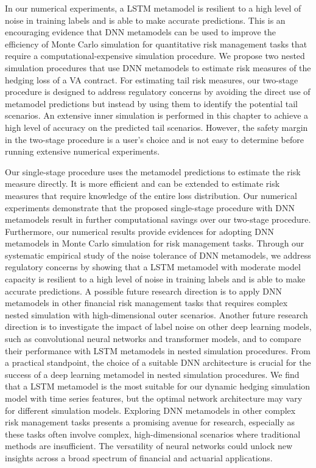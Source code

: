 In our numerical experiments, a LSTM metamodel is resilient to a high level of noise in training labels and is able to make accurate predictions. 
This is an encouraging evidence that DNN metamodels can be used to improve the efficiency of Monte Carlo simulation for quantitative risk management tasks that require a computational-expensive simulation procedure.
We propose two nested simulation procedures that use DNN metamodels to estimate risk measures of the hedging loss of a VA contract.
For estimating tail risk measures, our two-stage procedure is designed to address regulatory concerns by avoiding the direct use of metamodel predictions but instead by using them to identify the potential tail scenarios.
An extensive inner simulation is performed in this chapter to achieve a high level of accuracy on the predicted tail scenarios.
However, the safety margin in the two-stage procedure is a user's choice and is not easy to determine before running extensive numerical experiments.

Our single-stage procedure uses the metamodel predictions to estimate the risk measure directly.
It is more efficient and can be extended to estimate risk measures that require knowledge of the entire loss distribution.
Our numerical experiments demonstrate that the proposed single-stage procedure with DNN metamodels result in further computational savings over our two-stage procedure. 
Furthermore, our numerical results provide evidences for adopting DNN metamodels in Monte Carlo simulation for risk management tasks.
Through our systematic empirical study of the noise tolerance of DNN metamodels, we address regulatory concerns by showing that a LSTM metamodel with moderate model capacity is resilient to a high level of noise in training labels and is able to make accurate predictions.
A possible future research direction is to apply DNN metamodels in other financial risk management tasks that requires complex nested simulation with high-dimensional outer scenarios.
Another future research direction is to investigate the impact of label noise on other deep learning models, such as convolutional neural networks and transformer models, and to compare their performance with LSTM metamodels in nested simulation procedures. 
From a practical standpoint, the choice of a suitable DNN architecture is crucial for the success of a deep learning metamodel in nested simulation procedures.
We find that a LSTM metamodel is the most suitable for our dynamic hedging simulation model with time series features, but the optimal network architecture may vary for different simulation models.
Exploring DNN metamodels in other complex risk management tasks presents a promising avenue for research, especially as these tasks often involve complex, high-dimensional scenarios where traditional methods are insufficient. 
The versatility of neural networks could unlock new insights across a broad spectrum of financial and actuarial applications.

